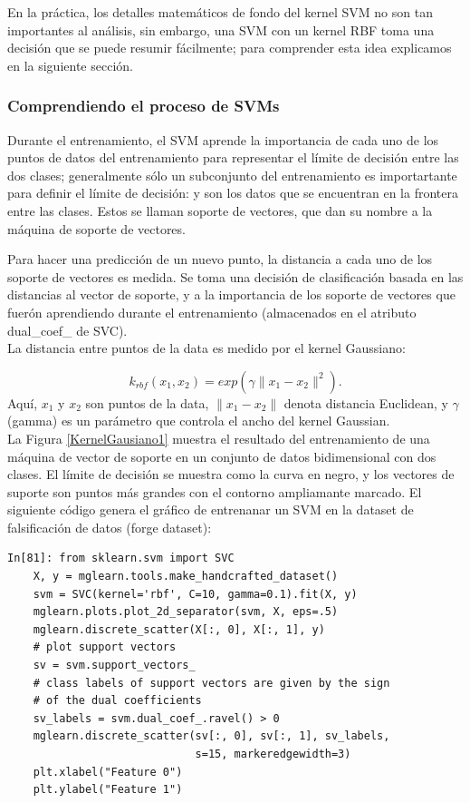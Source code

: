 {En la práctica, los detalles matemáticos de fondo del  kernel  SVM no son tan importantes al análisis, sin embargo,  una SVM con un kernel RBF toma una decisión que se puede resumir fácilmente; para comprender esta idea explicamos en la  siguiente sección. 

\subsubsection{Comprendiendo el proceso de SVMs}

Durante el entrenamiento, el SVM aprende la importancia de cada uno de los puntos de datos del entrenamiento para representar el límite de decisión entre las dos clases; generalmente  sólo un subconjunto del entrenamiento es importartante para definir el límite de decisión: y son los datos que se encuentran en la frontera entre las clases. Estos se llaman soporte de vectores, que dan su nombre a la máquina de soporte de vectores.


 Para hacer una predicción de un nuevo punto, la distancia a cada uno de los  soporte de vectores es medida. Se toma una decisión de clasificación basada en las distancias al vector de soporte, y a la importancia de los soporte de vectores que fuerón aprendiendo durante el entrenamiento (almacenados en el atributo  {\ttfamily dual\_coef\_} de SVC).\\


La distancia entre puntos de la data es medido por el kernel Gaussiano: 


\begin{equation}\label{gausss}
 k_{rbf}(x_{1}, x_{2}) = exp (\gamma \|x_{1} - x_{2}\|^{2} ). 
 \end{equation} Aquí, $x_{1}$  y  $x_{2} $  son puntos de la data, $\| x_{1} - x_{2} \| $ denota distancia Euclidean, y $\gamma$ (gamma) es un parámetro que controla el ancho del kernel Gaussian.\\


 La Figura \ref{KernelGausiano1} muestra el resultado del entrenamiento de una máquina de vector de soporte en un conjunto de datos bidimensional con dos clases. El límite de decisión se muestra como la curva  en negro, y los vectores de suporte son puntos más grandes con el contorno ampliamante marcado. El siguiente código genera el gráfico de entrenanar  un SVM en la dataset de falsificación de datos (forge dataset):

\begin{lstlisting}
In[81]: from sklearn.svm import SVC
	X, y = mglearn.tools.make_handcrafted_dataset()
	svm = SVC(kernel='rbf', C=10, gamma=0.1).fit(X, y)
	mglearn.plots.plot_2d_separator(svm, X, eps=.5)
	mglearn.discrete_scatter(X[:, 0], X[:, 1], y)
	# plot support vectors
	sv = svm.support_vectors_
	# class labels of support vectors are given by the sign 
	# of the dual coefficients
	sv_labels = svm.dual_coef_.ravel() > 0
	mglearn.discrete_scatter(sv[:, 0], sv[:, 1], sv_labels, 
	                         s=15, markeredgewidth=3)
	plt.xlabel("Feature 0")
	plt.ylabel("Feature 1")	
\end{lstlisting}


}
